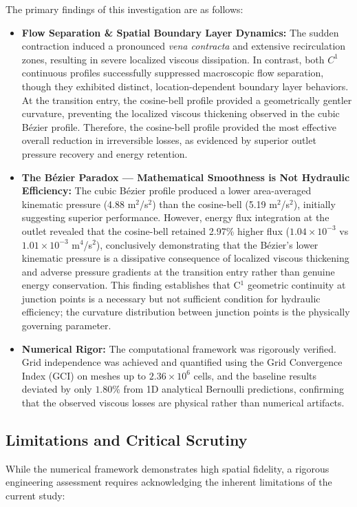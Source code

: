 \documentclass[12pt, a4paper]{article}
\begin{document}
The primary findings of this investigation are as follows:
\begin{itemize}
	\item \textbf{Flow Separation \& Spatial Boundary Layer Dynamics:} The sudden contraction induced a pronounced \textit{vena contracta} and extensive recirculation zones, resulting in severe localized viscous dissipation. In contrast, both $C^1$ continuous profiles successfully suppressed macroscopic flow separation, though they exhibited distinct, location-dependent boundary layer behaviors. At the transition entry, the cosine-bell profile provided a geometrically gentler curvature, preventing the localized viscous thickening observed in the cubic B\'{e}zier profile. Therefore, the cosine-bell profile provided the most effective overall reduction in irreversible losses, as evidenced by superior outlet pressure recovery and energy retention.
	\item \textbf{The Bézier Paradox --- Mathematical Smoothness is Not Hydraulic Efficiency:} The cubic Bézier profile produced a lower area-averaged kinematic pressure (4.88 m$^2$/s$^2$) than the cosine-bell (5.19 m$^2$/s$^2$), initially suggesting superior performance. However, energy flux integration at the outlet revealed that the cosine-bell retained 2.97\% higher flux ($1.04 \times 10^{-3}$ vs $1.01 \times 10^{-3}$ m$^
	4$/s$^2$), conclusively demonstrating that the Bézier's lower kinematic pressure is a dissipative consequence of localized viscous thickening and adverse pressure gradients at the transition entry rather than genuine energy conservation. This finding establishes that C$^1$ geometric continuity at junction points is a necessary but not sufficient condition for hydraulic efficiency; the curvature distribution between junction points is the physically governing parameter.
	\item \textbf{Numerical Rigor:} The computational framework was rigorously verified. Grid independence was achieved and quantified using the Grid Convergence Index (GCI) on meshes up to $2.36 \times 10^6$ cells, and the baseline results deviated by only $1.80\%$ from 1D analytical Bernoulli predictions, confirming that the observed viscous losses are physical rather than numerical artifacts.
	
\end{itemize}

\subsection*{Limitations and Critical Scrutiny}
While the numerical framework demonstrates high spatial fidelity, a rigorous engineering assessment requires acknowledging the inherent limitations of the current study:
\end{document}
